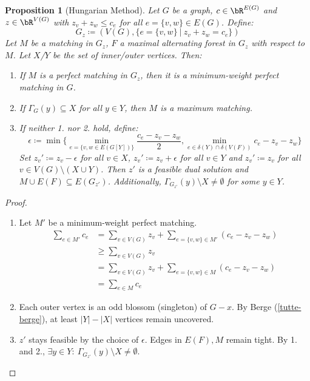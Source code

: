 \documentclass[11pt, a4paper]{article}
\newcommand{\abs}[1]{\left\lvert#1\right\rvert}
\newcommand{\set}[1]{\{#1\}}
\newtheorem{prop}[theorem]{Proposition}
\theoremstyle{remark}
\theoremstyle{definition}
\begin{document}
\begin{prop}[Hungarian Method]
	Let $G$ be a graph, $c\in\bR^{E(G)}$ and $z\in\bR^{V(G)}$ with
	$z_v+z_w\leq c_e$ for all $e=\set{v,w}\in E(G)$. Define:
	\[G_z\coloneqq (V(G), \set{e=\set{v,w}\ |\ z_v+z_w=c_e})\]
	Let $M$ be a matching in $G_z$, $F$ a maximal alternating forest in
	$G_z$ with respect to $M$. Let $X$/$Y$ be the set of inner/outer
	vertices. Then:
	\begin{enumerate}
		\item If $M$ is a perfect matching in $G_z$, then it is a minimum-weight
		perfect matching in $G$.
		\item If $\Gamma_G(y)\subseteq X$ for all $y\in Y$, then $M$ is a maximum
		matching.
		\item If neither 1. nor 2. hold, define:
		\[
			\epsilon\coloneqq\min\set{
				\min_{e=\set{v,w\in E(G[Y])}}\frac{c_e-z_v-z_w}{2},
				\min_{e\in \delta(Y)\cap \delta(V(F))}c_e-z_v-z_w}
		\]
		Set $z_v'\coloneqq z_v-\epsilon$ for all $v\in X$, $z_v'\coloneqq
			z_v+\epsilon$ for all $v\in Y$ and $z_v'\coloneqq z_v$ for all $v\in
			V(G)\setminus(X\cup Y)$. Then $z'$ is a feasible dual solution and
		$M\cup E(F)\subseteq E(G_{z'})$. Additionally,
		$\Gamma_{G_{z'}}(y)\setminus X\neq\emptyset$ for some $y\in Y$.
	\end{enumerate}
\end{prop}
\begin{proof}
	\begin{enumerate}
		\item
		Let $M'$ be a minimum-weight perfect matching.
		\begin{align*}
			\sum_{e\in M'}c_e & =\sum_{v\in V(G)}z_v+\sum_{e=\set{v,w}\in M'}(c_e-z_v-z_w) \\
			                  & \geq \sum_{v\in V(G)}z_v                                   \\
			                  & =\sum_{v\in V(G)}z_v+\sum_{e=\set{v,w}\in M}(c_e-z_v-z_w)  \\
			                  & =\sum_{e\in M}c_e
		\end{align*}

		\item
		Each outer vertex is an odd blossom (singleton) of $G-x$. By Berge
		(\ref{tutte-berge}), at least $\abs{Y}-\abs{X}$ vertices remain uncovered.

		\item
		$z'$ stays feasible by the choice of $\epsilon$. Edges in $E(F),M$ remain
		tight. By 1. and 2., $\exists y\in Y:\ \Gamma_{G_{z'}}(y)\setminus X\neq\emptyset$.

	\end{enumerate}
\end{proof}
\end{document}
